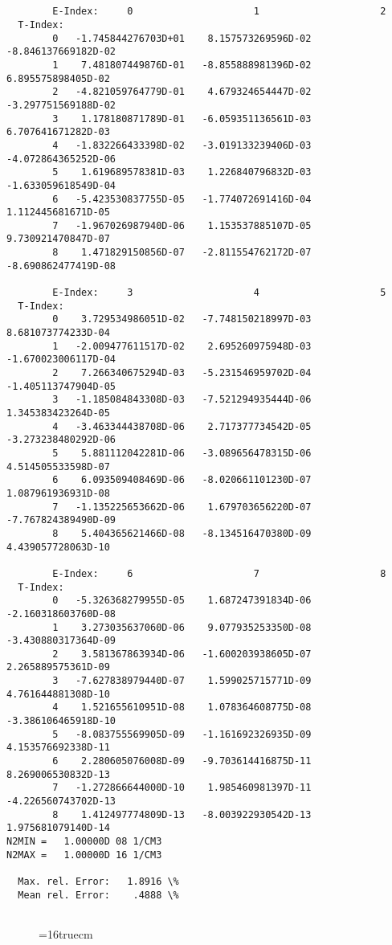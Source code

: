 \documentclass[12pt,dvipdfmx]{article}
\begin{document}
\begin{small}\begin{verbatim}


        E-Index:     0                     1                     2
  T-Index:
        0   -1.745844276703D+01    8.157573269596D-02   -8.846137669182D-02
        1    7.481807449876D-01   -8.855888981396D-02    6.895575898405D-02
        2   -4.821059764779D-01    4.679324654447D-02   -3.297751569188D-02
        3    1.178180871789D-01   -6.059351136561D-03    6.707641671282D-03
        4   -1.832266433398D-02   -3.019133239406D-03   -4.072864365252D-06
        5    1.619689578381D-03    1.226840796832D-03   -1.633059618549D-04
        6   -5.423530837755D-05   -1.774072691416D-04    1.112445681671D-05
        7   -1.967026987940D-06    1.153537885107D-05    9.730921470847D-07
        8    1.471829150856D-07   -2.811554762172D-07   -8.690862477419D-08

        E-Index:     3                     4                     5
  T-Index:
        0    3.729534986051D-02   -7.748150218997D-03    8.681073774233D-04
        1   -2.009477611517D-02    2.695260975948D-03   -1.670023006117D-04
        2    7.266340675294D-03   -5.231546959702D-04   -1.405113747904D-05
        3   -1.185084843308D-03   -7.521294935444D-06    1.345383423264D-05
        4   -3.463344438708D-06    2.717377734542D-05   -3.273238480292D-06
        5    5.881112042281D-06   -3.089656478315D-06    4.514505533598D-07
        6    6.093509408469D-06   -8.020661101230D-07    1.087961936931D-08
        7   -1.135225653662D-06    1.679703656220D-07   -7.767824389490D-09
        8    5.404365621466D-08   -8.134516470380D-09    4.439057728063D-10

        E-Index:     6                     7                     8
  T-Index:
        0   -5.326368279955D-05    1.687247391834D-06   -2.160318603760D-08
        1    3.273035637060D-06    9.077935253350D-08   -3.430880317364D-09
        2    3.581367863934D-06   -1.600203938605D-07    2.265889575361D-09
        3   -7.627838979440D-07    1.599025715771D-09    4.761644881308D-10
        4    1.521655610951D-08    1.078364608775D-08   -3.386106465918D-10
        5   -8.083755569905D-09   -1.161692326935D-09    4.153576692338D-11
        6    2.280605076008D-09   -9.703614416875D-11    8.269006530832D-13
        7   -1.272866644000D-10    1.985460981397D-11   -4.226560743702D-13
        8    1.412497774809D-13   -8.003922930542D-13    1.975681079140D-14
N2MIN =   1.00000D 08 1/CM3
N2MAX =   1.00000D 16 1/CM3

  Max. rel. Error:   1.8916 \%
  Mean rel. Error:    .4888 \%


\end{verbatim}\end{small}
\begin{figure} \label{2.3.9i}
\epsfxsize=16truecm
\end{figure}
\newpage
\end{document}
